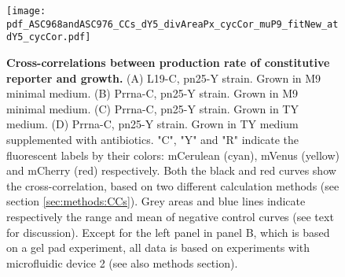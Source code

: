 \begin{figure}
    \centering
    \texttt{[image: pdf\_ASC968andASC976\_CCs\_dY5\_divAreaPx\_cycCor\_muP9\_fitNew\_atdY5\_cycCor.pdf]}
    \caption{ 
        \textbf{Cross-correlations between production rate of constitutive reporter and growth.}
        (A) L19-C, pn25-Y strain. Grown in M9 minimal medium.
        (B) Prrna-C, pn25-Y strain. Grown in M9 minimal medium.        
        (C) Prrna-C, pn25-Y strain. Grown in TY medium.
        (D) Prrna-C, pn25-Y strain. Grown in TY medium supplemented with antibiotics.
        "C", "Y" and "R" indicate the fluorescent labels by their colors: mCerulean (cyan), mVenus (yellow) and mCherry (red) respectively.
        Both the black and red curves show the cross-correlation, based on two different calculation methods (see section \ref{sec:methods:CCs}).
        Grey areas and blue lines indicate respectively the range and mean of negative control curves (see text for discussion).        
        Except for the left panel in panel B, which is based on a gel pad experiment, all data is based on experiments with microfluidic device 2 (see also methods section).
    }
    \label{fig:ribo:CCsPmuYpn25}
\end{figure}



